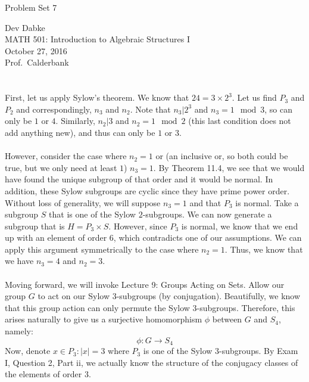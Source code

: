 \documentclass[letterpaper]{article}
\def\name{Problem Set 7}
\begin{document}
{\huge \name}


\vspace{0.25in}

Dev Dabke \\
MATH 501: Introduction to Algebraic Structures I \\
October 27, 2016 \\
Prof.\ Calderbank \\

\section{}
\label{sec:Question1}

First, let us apply Sylow's theorem.
We know that $ 24 = 3 \times 2^3 $.
Let us find $ P_3 $ and $ P_2 $ and correspondingly, $ n_3 $ and $ n_2 $.
Note that $ n_3 | 2^3 $ and $ n_3 = 1 \mod{3} $, so can only be $ 1 $ or $ 4 $.
Similarly, $ n_2 | 3 $ and $ n_2 = 1 \mod{2} $ (this last condition does not add anything new), and thus can only be $ 1 $ or $ 3 $.
\\ \\
However, consider the case where $ n_2 = 1 $ or (an inclusive or, so both could be true, but we only need at least $ 1 $) $ n_3 = 1 $.
By Theorem 11.4, we see that we would have found the unique subgroup of that order and it would be normal.
In addition, these Sylow subgroups are cyclic since they have prime power order.
Without loss of generality, we will suppose $ n_3 = 1 $ and that $ P_3 $ is normal.
Take a subgroup $ S $ that is one of the Sylow $ 2 $-subgroups.
We can now generate a subgroup that is $ H = P_3 \times S $.
However, since $ P_3 $ is normal, we know that we end up with an element of order $ 6 $, which contradicts one of our assumptions.
We can apply this argument symmetrically to the case where $ n_2 = 1 $.
Thus, we know that we have $ n_3 = 4 $ and $ n_2 = 3 $.
\\ \\
Moving forward, we will invoke Lecture 9: Groups Acting on Sets.
Allow our group $ G $ to act on our Sylow $ 3 $-subgroups (by conjugation).
Beautifully, we know that this group action can only permute the Sylow $ 3 $-subgroups.
Therefore, this arises naturally to give us a surjective homomorphism $ \phi $ between $ G $ and $ S_4 $, namely:
\[
\phi : G \to S_4
\]
Now, denote $ x \in P_3 : |x| = 3 $ where $ P_3 $ is one of the Sylow $ 3 $-subgroups.
By Exam I, Question 2, Part ii, we actually know the structure of the conjugacy classes of the elements of order $ 3 $.
\end{document}
